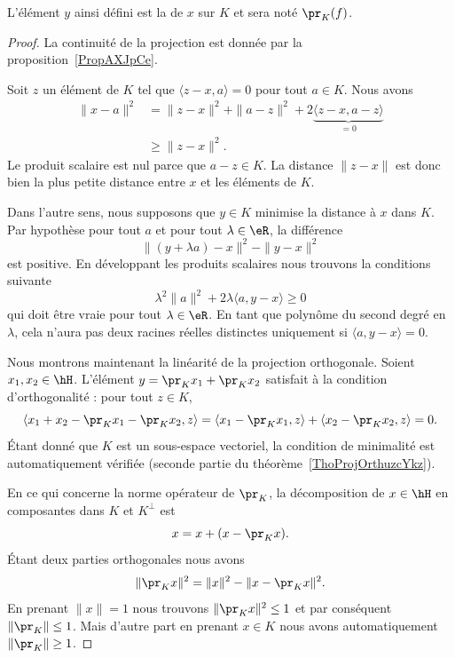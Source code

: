 L'élément \( y\) ainsi défini est la  de \( x\) sur \( K\) et sera noté \( \pr_K(f)\).

\begin{proof}

	La continuité de la projection est donnée par la proposition~\ref{PropAXJpCe}.

	Soit \( z\) un élément de \( K\) tel que \( \langle z-x, a\rangle =0\) pour tout \( a\in K\). Nous avons
	\begin{subequations}
		\begin{align}
			\| x-a \|^2 & =\| z-x \|^2+\| a-z \|^2+2\underbrace{\langle z-x, a-z\rangle}_{=0} \\
			            & \geq \| z-x \|^2.
		\end{align}
	\end{subequations}
	Le produit scalaire est nul parce que \( a-z\in K\). La distance \( \| z-x \|\) est donc bien la plus petite distance entre \( x\) et les éléments de \( K\).

	Dans l'autre sens, nous supposons que \( y\in K\) minimise la distance à \( x\) dans \( K\). Par hypothèse pour tout \( a\) et pour tout \( \lambda\in \eR\), la différence
	\begin{equation}
		\| (y+\lambda a)-x \|^2-\| y-x \|^2
	\end{equation}
	est positive. En développant les produits scalaires nous trouvons la conditions suivante
	\begin{equation}
		\lambda^2\| a \|^2+2\lambda\langle a, y-x\rangle \geq 0
	\end{equation}
	qui doit être vraie pour tout \( \lambda\in\eR\). En tant que polynôme du second degré en \( \lambda\), cela n'aura pas deux racines réelles distinctes uniquement si \( \langle a, y-x\rangle =0\).

	Nous montrons maintenant la linéarité de la projection orthogonale. Soient \( x_1,x_2\in\hH\). L'élément \( y=\pr_Kx_1+\pr_Kx_2\) satisfait à la condition d'orthogonalité : pour tout \( z\in K\),
	\begin{equation}
		\langle x_1+x_2-\pr_Kx_1-\pr_Kx_2, z\rangle =\langle x_1-\pr_Kx_1, z\rangle +\langle x_2-\pr_Kx_2, z\rangle =0.
	\end{equation}
	Étant donné que \( K\) est un sous-espace vectoriel, la condition de minimalité est automatiquement vérifiée (seconde partie du théorème~\ref{ThoProjOrthuzcYkz}).

	En ce qui concerne la norme opérateur de \( \pr_K\), la décomposition de \( x\in\hH\) en composantes dans \( K\) et \( K^{\perp}\) est
	\begin{equation}
		x=x+(x-\pr_Kx).
	\end{equation}
	Étant deux parties orthogonales nous avons
	\begin{equation}
		\| \pr_Kx \|^2=\| x \|^2-\| x-\pr_Kx \|^2.
	\end{equation}
	En prenant \( \| x \|=1\) nous trouvons \( \| \pr_Kx \|^2\leq 1\) et par conséquent \( \| \pr_K \|\leq 1\). Mais d'autre part en prenant \( x\in K\) nous avons automatiquement \( \| \pr_K \|\geq 1\).
\end{proof}

